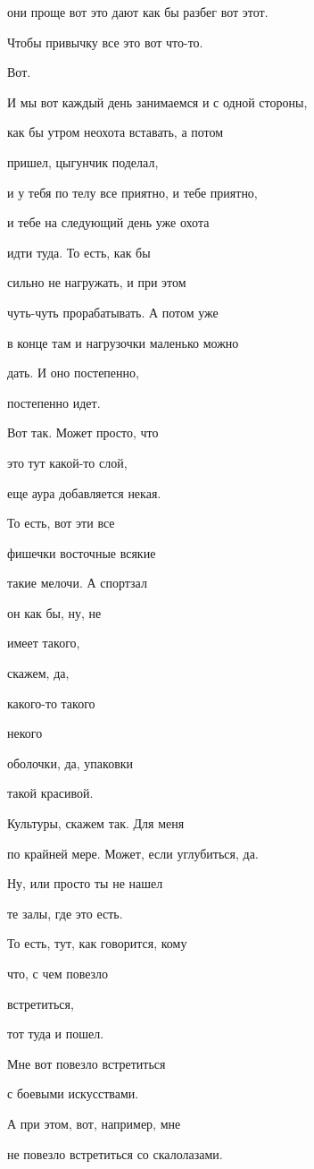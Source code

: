 они проще вот это дают как бы разбег вот этот.

Чтобы привычку все это вот что-то.

Вот.

И мы вот каждый день занимаемся и с одной стороны,

как бы утром неохота вставать, а потом

пришел, цыгунчик поделал,

и у тебя по телу все приятно, и тебе приятно,

и тебе на следующий день уже охота

идти туда. То есть, как бы

сильно не нагружать, и при этом

чуть-чуть прорабатывать. А потом уже

в конце там и нагрузочки маленько можно

дать. И оно постепенно,

постепенно идет.

Вот так. Может просто, что

это тут какой-то слой,

еще аура добавляется некая.

То есть, вот эти все

фишечки восточные всякие

такие мелочи. А спортзал

он как бы, ну, не

имеет такого,

скажем, да,

какого-то такого

некого

оболочки, да, упаковки

такой красивой.

Культуры, скажем так. Для меня

по крайней мере. Может, если углубиться, да.

Ну, или просто ты не нашел

те залы, где это есть.

То есть, тут, как говорится, кому

что, с чем повезло

встретиться,

тот туда и пошел.

Мне вот повезло встретиться

с боевыми искусствами.

А при этом, вот, например, мне

не повезло встретиться со скалолазами.


